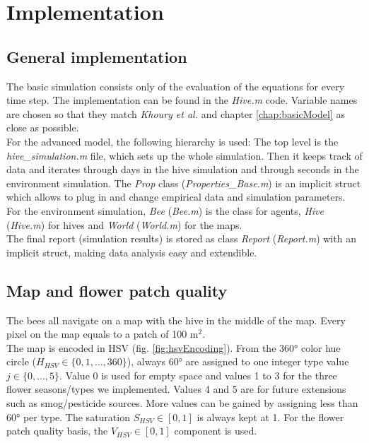 \section{Implementation}
\subsection{General implementation}
	The basic simulation consists only of the evaluation of the equations for every time step. The implementation can be found in the \textit{Hive.m} code. Variable names are chosen so that they match \textit{Khoury et al.} \cite{khoury13} and chapter \ref{chap:basicModel} as close as possible.\\
	For the advanced model, the following hierarchy is used: The top level is the \textit{hive\_simulation.m} file, which sets up the whole simulation. Then it keeps track of data and iterates through days in the hive simulation and through seconds in the environment simulation. The \textit{Prop} class (\textit{Properties\_Base.m}) is an implicit struct which allows to plug in and change empirical data and simulation parameters. For the environment simulation, \textit{Bee} (\textit{Bee.m}) is the class for agents, \textit{Hive} (\textit{Hive.m}) for hives and \textit{World} (\textit{World.m}) for the maps.\\
	The final report (simulation results) is stored as class \textit{Report} (\textit{Report.m}) with an implicit struct, making data analysis easy and extendible.\\
	
\subsection{Map and flower patch quality}
	\label{chap:mapFlowerPatchQuality}
	
	The bees all navigate on a map with the hive in the middle of the map. Every pixel on the map equals to a patch of 100 m$^2$.\\
	
	The map is encoded in HSV (fig. \ref{fig:hsvEncoding}). From the 360° color hue circle ($H_{HSV} \in \{0,1,\ldots,360\}$), always 60° are assigned to one integer type value $j \in \{0,\ldots,5\}$. Value 0 is used for empty space and values 1 to 3 for the three flower seasons/types we implemented. Values 4 and 5 are for future extensions such as smog/pesticide sources. More values can be gained by assigning less than 60° per type. The saturation $S_{HSV} \in [0,1]$ is always kept at 1. For the flower patch quality basis, the $V_{HSV} \in [0,1]$ component is used.\\
	
